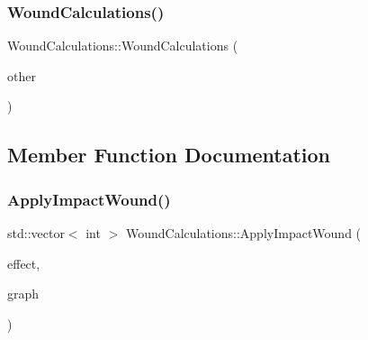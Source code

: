 \mbox{\label{class_wound_calculations_acd469ea09e0959d8d79eece4b9e37cff}} 
\subsubsection{\texorpdfstring{Wound\+Calculations()}{WoundCalculations()}\hspace{0.1cm}{\footnotesize\ttfamily [3/3]}}
{\footnotesize\ttfamily Wound\+Calculations\+::\+Wound\+Calculations (\begin{DoxyParamCaption}\item[{const \mbox{\hyperlink{class_wound_calculations}{Wound\+Calculations}} \&}]{other }\end{DoxyParamCaption})}



\subsection{Member Function Documentation}
\mbox{\label{class_wound_calculations_a645dc9bb6dfc7d5fc20fc8e8b91fd430}} 
\subsubsection{\texorpdfstring{Apply\+Impact\+Wound()}{ApplyImpactWound()}}
{\footnotesize\ttfamily std\+::vector$<$ int $>$ Wound\+Calculations\+::\+Apply\+Impact\+Wound (\begin{DoxyParamCaption}\item[{\mbox{\hyperlink{struct_applied_force_effect}{Applied\+Force\+Effect}} \&}]{effect,  }\item[{\mbox{\hyperlink{_body_graph_8hpp_ab01b157c2e143191570b012d275fbf0d}{Anatomy\+Graph}} \&}]{graph }\end{DoxyParamCaption})}

